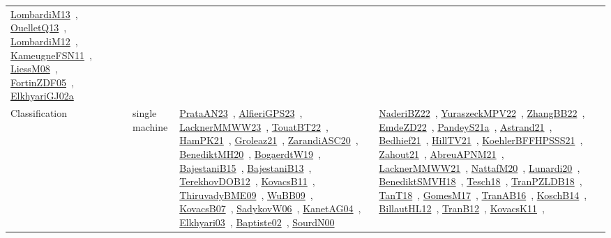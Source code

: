 {\begin{longtable}{lp{3cm}>{\raggedright\arraybackslash}p{6cm}>{\raggedright\arraybackslash}p{6cm}>{\raggedright\arraybackslash}p{8cm}}
\href{works/LombardiM13.pdf}{LombardiM13}~\cite{LombardiM13}, \href{works/OuelletQ13.pdf}{OuelletQ13}~\cite{OuelletQ13}, \href{works/LombardiM12.pdf}{LombardiM12}~\cite{LombardiM12}, \href{works/KameugneFSN11.pdf}{KameugneFSN11}~\cite{KameugneFSN11}, \href{works/LiessM08.pdf}{LiessM08}~\cite{LiessM08}, \href{works/FortinZDF05.pdf}{FortinZDF05}~\cite{FortinZDF05}, \href{works/ElkhyariGJ02a.pdf}{ElkhyariGJ02a}~\cite{ElkhyariGJ02a}\\
Classification & single machine & \href{works/PrataAN23.pdf}{PrataAN23}~\cite{PrataAN23}, \href{works/AlfieriGPS23.pdf}{AlfieriGPS23}~\cite{AlfieriGPS23}, \href{works/LacknerMMWW23.pdf}{LacknerMMWW23}~\cite{LacknerMMWW23}, \href{works/TouatBT22.pdf}{TouatBT22}~\cite{TouatBT22}, \href{works/HamPK21.pdf}{HamPK21}~\cite{HamPK21}, \href{works/Groleaz21.pdf}{Groleaz21}~\cite{Groleaz21}, \href{works/ZarandiASC20.pdf}{ZarandiASC20}~\cite{ZarandiASC20}, \href{works/BenediktMH20.pdf}{BenediktMH20}~\cite{BenediktMH20}, \href{works/BogaerdtW19.pdf}{BogaerdtW19}~\cite{BogaerdtW19}, \href{works/BajestaniB15.pdf}{BajestaniB15}~\cite{BajestaniB15}, \href{works/BajestaniB13.pdf}{BajestaniB13}~\cite{BajestaniB13}, \href{works/TerekhovDOB12.pdf}{TerekhovDOB12}~\cite{TerekhovDOB12}, \href{works/KovacsB11.pdf}{KovacsB11}~\cite{KovacsB11}, \href{works/ThiruvadyBME09.pdf}{ThiruvadyBME09}~\cite{ThiruvadyBME09}, \href{works/WuBB09.pdf}{WuBB09}~\cite{WuBB09}, \href{works/KovacsB07.pdf}{KovacsB07}~\cite{KovacsB07}, \href{works/SadykovW06.pdf}{SadykovW06}~\cite{SadykovW06}, \href{works/KanetAG04.pdf}{KanetAG04}~\cite{KanetAG04}, \href{works/Elkhyari03.pdf}{Elkhyari03}~\cite{Elkhyari03}, \href{works/Baptiste02.pdf}{Baptiste02}~\cite{Baptiste02}, \href{works/SourdN00.pdf}{SourdN00}~\cite{SourdN00} & \href{works/NaderiBZ22.pdf}{NaderiBZ22}~\cite{NaderiBZ22}, \href{works/YuraszeckMPV22.pdf}{YuraszeckMPV22}~\cite{YuraszeckMPV22}, \href{works/ZhangBB22.pdf}{ZhangBB22}~\cite{ZhangBB22}, \href{works/EmdeZD22.pdf}{EmdeZD22}~\cite{EmdeZD22}, \href{works/PandeyS21a.pdf}{PandeyS21a}~\cite{PandeyS21a}, \href{works/Astrand21.pdf}{Astrand21}~\cite{Astrand21}, \href{works/Bedhief21.pdf}{Bedhief21}~\cite{Bedhief21}, \href{works/HillTV21.pdf}{HillTV21}~\cite{HillTV21}, \href{works/KoehlerBFFHPSSS21.pdf}{KoehlerBFFHPSSS21}~\cite{KoehlerBFFHPSSS21}, \href{works/Zahout21.pdf}{Zahout21}~\cite{Zahout21}, \href{works/AbreuAPNM21.pdf}{AbreuAPNM21}~\cite{AbreuAPNM21}, \href{works/LacknerMMWW21.pdf}{LacknerMMWW21}~\cite{LacknerMMWW21}, \href{works/NattafM20.pdf}{NattafM20}~\cite{NattafM20}, \href{works/Lunardi20.pdf}{Lunardi20}~\cite{Lunardi20}, \href{works/BenediktSMVH18.pdf}{BenediktSMVH18}~\cite{BenediktSMVH18}, \href{works/Tesch18.pdf}{Tesch18}~\cite{Tesch18}, \href{works/TranPZLDB18.pdf}{TranPZLDB18}~\cite{TranPZLDB18}, \href{works/TanT18.pdf}{TanT18}~\cite{TanT18}, \href{works/GomesM17.pdf}{GomesM17}~\cite{GomesM17}, \href{works/TranAB16.pdf}{TranAB16}~\cite{TranAB16}, \href{works/KoschB14.pdf}{KoschB14}~\cite{KoschB14}, \href{works/BillautHL12.pdf}{BillautHL12}~\cite{BillautHL12}, \href{works/TranB12.pdf}{TranB12}~\cite{TranB12}, \href{works/KovacsK11.pdf}{KovacsK11}~\cite{KovacsK11}, 
\end{longtable}}
